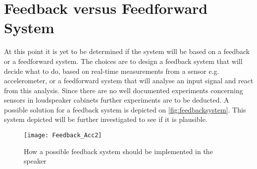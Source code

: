 \section{Feedback versus Feedforward System} \label{sec:feedback}

At this point it is yet to be determined if the system will be based on a feedback or a feedforward system. The choices are to design a feedback system that will decide what to do, based on real-time measurements from a sensor e.g. accelerometer, or a feedforward system that will analyse an input signal and react from this analysis. Since there are no well documented experiments concerning sensors in loudspeaker cabinets further experiments are to be deducted. A possible solution for a feedback system is depicted on \autoref{fig:feedbacksystem}. This system depicted will be further investigated to see if it is plausible.

\begin{figure}[H]
\centering
\texttt{[image: Feedback\_Acc2]}
\caption{How a possible feedback system should be implemented in the speaker}
\label{fig:feedbacksystem}
\end{figure}


